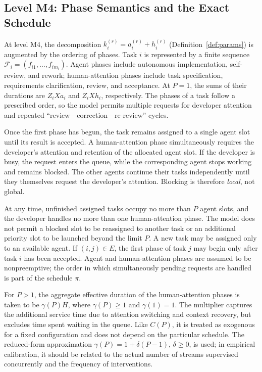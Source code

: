 \subsection{Level M4: Phase Semantics and the Exact Schedule}

\begin{remark}\label{rem:human}
At level M4, the decomposition $k_i^{(r)} = a_i^{(r)} + h_i^{(r)}$ (Definition~\ref{def:params}) is augmented by the ordering of phases. Task $i$ is represented by a finite sequence $\mathcal F_i=(f_{i1},\dots,f_{im_i})$. Agent phases include autonomous implementation, self-review, and rework; human-attention phases include task specification, requirements clarification, review, and acceptance. At $P=1$, the sums of their durations are $Z_iXa_i$ and $Z_iXh_i$, respectively. The phases of a task follow a prescribed order, so the model permits multiple requests for developer attention and repeated ``review---correction---re-review'' cycles.

Once the first phase has begun, the task remains assigned to a single agent slot until its result is accepted. A human-attention phase simultaneously requires the developer's attention and retention of the allocated agent slot. If the developer is busy, the request enters the queue, while the corresponding agent stops working and remains blocked. The other agents continue their tasks independently until they themselves request the developer's attention. Blocking is therefore \emph{local}, not global.

At any time, unfinished assigned tasks occupy no more than $P$ agent slots, and the developer handles no more than one human-attention phase. The model does not permit a blocked slot to be reassigned to another task or an additional priority slot to be launched beyond the limit $P$. A new task may be assigned only to an available agent.
If $(i,j)\in E$, the first phase of task $j$ may begin only after task $i$ has
been accepted. Agent and human-attention phases are assumed to be
nonpreemptive; the order in which simultaneously pending requests are handled
is part of the schedule $\pi$.

For $P>1$, the aggregate effective duration of the human-attention phases is taken to be $\gamma(P)H$, where $\gamma(P)\ge1$ and $\gamma(1)=1$. The multiplier captures the additional service time due to attention switching and context recovery, but excludes time spent waiting in the queue. Like $C(P)$, it is treated as exogenous for a fixed configuration and does not depend on the particular schedule. The reduced-form approximation $\gamma(P)=1+\delta(P-1)$, $\delta\ge0$, is used; in empirical calibration, it should be related to the actual number of streams supervised concurrently and the frequency of interventions.


\end{remark}
